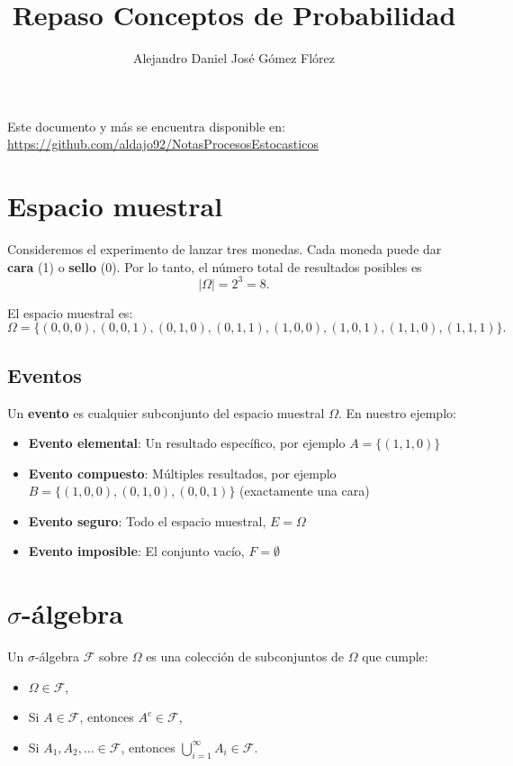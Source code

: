 \documentclass[12pt]{article}
\title{Repaso Conceptos de Probabilidad}
\author{Alejandro Daniel José Gómez Flórez}
\date{}
\begin{document}
\maketitle

Este documento y más se encuentra disponible en: \\
\url{https://github.com/aldajo92/NotasProcesosEstocasticos}

\section{Espacio muestral}

Consideremos el experimento de lanzar tres monedas. Cada moneda puede dar
\textbf{cara} (1) o \textbf{sello} (0). Por lo tanto, el número total de
resultados posibles es
\begin{equation*}
|\Omega| = 2^3 = 8.
\end{equation*}

El espacio muestral es:
\begin{equation*}
\Omega = \{(0,0,0), (0,0,1), (0,1,0), (0,1,1), (1,0,0), (1,0,1), (1,1,0), (1,1,1)\}.
\end{equation*}

\subsection{Eventos}

Un \textbf{evento} es cualquier subconjunto del espacio muestral $\Omega$. En nuestro ejemplo:

\begin{itemize}
    \item \textbf{Evento elemental}: Un resultado específico, por ejemplo $A = \{(1,1,0)\}$
    \item \textbf{Evento compuesto}: Múltiples resultados, por ejemplo $B = \{(1,0,0), (0,1,0), (0,0,1)\}$ (exactamente una cara)
    \item \textbf{Evento seguro}: Todo el espacio muestral, $E = \Omega$
    \item \textbf{Evento imposible}: El conjunto vacío, $F = \emptyset$
\end{itemize}

\section{$\sigma$-álgebra}

Un $\sigma$-álgebra $\mathcal{F}$ sobre $\Omega$ es una colección de
subconjuntos de $\Omega$ que cumple:
\begin{itemize}
    \item $\Omega \in \mathcal{F}$,
    \item Si $A \in \mathcal{F}$, entonces $A^c \in \mathcal{F}$,
    \item Si $A_1, A_2, \dots \in \mathcal{F}$, entonces $\bigcup_{i=1}^\infty A_i \in \mathcal{F}$.
\end{itemize}
\end{document}
